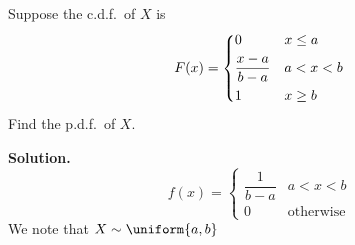 \begin{Example}{}{}
    Suppose the c.d.f.\ of $ X $ is
    \[ F(x)=\begin{dcases}
            0               & x\le a \\
            \frac{x-a}{b-a} & a<x<b  \\
            1               & x\ge b
        \end{dcases} \]
    Find the p.d.f.\ of $ X $.

    \textbf{Solution.}
    \[ f(x)=
        \begin{cases}
            \dfrac{1}{b-a} & a<x<b            \\
            0              & \text{otherwise}
        \end{cases} \]
    We note that $ X \sim \uniform{a,b} $
\end{Example}

